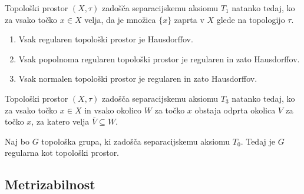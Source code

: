 \documentclass[mat1]{fmfdelo}
\newcommand{\closure}[1]{\overline{#1}}
\begin{document}
\begin{trditev}\label{def:kart1}
Topološki prostor $(X, \tau)$ zadošča separacijskemu aksiomu $T_1$ natanko tedaj, ko za vsako točko $x \in X$ velja, da je množica $\lbrace x \rbrace$ zaprta v $X$ glede na topologijo $\tau$.
\end{trditev}

\begin{posledica}\label{pos:reghaus}
\begin{enumerate}
\item Vsak regularen topološki prostor je Hausdorffov.
\item Vsak popolnoma regularen topološki prostor je regularen in zato Hausdorffov.
\item Vsak normalen topološki prostor je regularen in zato Hausdorffov.
\end{enumerate}
\end{posledica}

\begin{trditev}\label{def:kart3}
Topološki prostor $(X, \tau)$ zadošča separacijskemu aksiomu $T_3$ natanko tedaj, ko za vsako točko $x \in X$ in vsako okolico $W$ za točko $x$ obstaja odprta okolica $V$ za točko $x$, za katero velja $\closure{V} \subseteq W$.
\end{trditev}

\begin{izrek}\label{izr:t3}
Naj bo $G$ topološka grupa, ki zadošča separacijskemu aksiomu $T_0$. Tedaj je $G$ regularna kot topološki prostor.
\end{izrek}

\subsection{Metrizabilnost}
\end{document}
